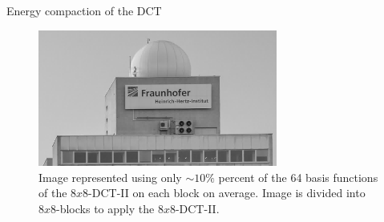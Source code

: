 \begin{frame}{Energy compaction of the DCT}
\begin{figure}
\includegraphics[width=0.70\textwidth]{TrCoding/HHI_gray_trafozero_ausschnitt.png}
\captionsetup{labelformat=empty}
\caption{Image represented using only $\sim 10\%$ percent of the  64 basis functions of the $8x8$-DCT-II on each block on average. Image is divided into $8x8$-blocks to apply the $8x8$-DCT-II. }
\end{figure}
\end{frame}


